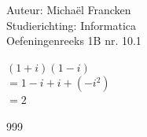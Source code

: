 \documentclass[a4paper]{article}
\begin{document}
\noindent \large Auteur: Michaël Francken \\
\noindent \large Studierichting: Informatica\\
\noindent \large Oefeningenreeks 1B nr. 10.1\\

\medskip

\normalsize

$\left(1+i\right)\left(1-i\right)$\\

$=1-i+i+\left(-i^2\right)$\\

$=2$\\

\begin{thebibliography}{999}
\end{thebibliography}
\end{document}
